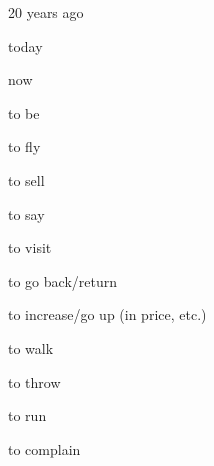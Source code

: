 \begin{flashcard}{\LARGE 20 years ago}
\LARGE {}
\end{flashcard}
\begin{flashcard}{\LARGE today}
\LARGE {}
\end{flashcard}
\begin{flashcard}{\LARGE now}
\LARGE {}
\end{flashcard}
\begin{flashcard}{\LARGE to be}
\LARGE {}
\end{flashcard}
\begin{flashcard}{\LARGE to fly}
\LARGE {}
\end{flashcard}
\begin{flashcard}{\LARGE to sell}
\LARGE {}
\end{flashcard}
\begin{flashcard}{\LARGE to say}
\LARGE {}
\end{flashcard}
\begin{flashcard}{\LARGE to visit}
\LARGE {}
\end{flashcard}
\begin{flashcard}{\LARGE to go back/return}
\LARGE {}
\end{flashcard}
\begin{flashcard}{\LARGE to increase/go up (in price, etc.)}
\LARGE {}
\end{flashcard}
\begin{flashcard}{\LARGE to walk}
\LARGE {}
\end{flashcard}
\begin{flashcard}{\LARGE to throw}
\LARGE {}
\end{flashcard}
\begin{flashcard}{\LARGE to run}
\LARGE {}
\end{flashcard}
\begin{flashcard}{\LARGE to complain}
\LARGE {}
\end{flashcard}


